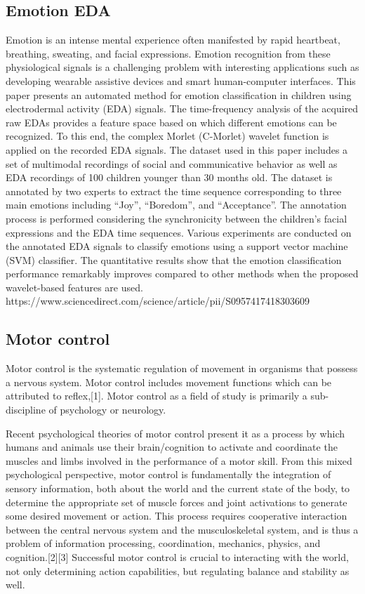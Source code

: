 \subsection{Emotion EDA}
Emotion is an intense mental experience often manifested by rapid heartbeat, breathing, sweating, and facial expressions. Emotion recognition from these physiological signals is a challenging problem with interesting applications such as developing wearable assistive devices and smart human-computer interfaces. This paper presents an automated method for emotion classification in children using electrodermal activity (EDA) signals. The time-frequency analysis of the acquired raw EDAs provides a feature space based on which different emotions can be recognized. To this end, the complex Morlet (C-Morlet) wavelet function is applied on the recorded EDA signals. The dataset used in this paper includes a set of multimodal recordings of social and communicative behavior as well as EDA recordings of 100 children younger than 30 months old. The dataset is annotated by two experts to extract the time sequence corresponding to three main emotions including “Joy”, “Boredom”, and “Acceptance”. The annotation process is performed considering the synchronicity between the children's facial expressions and the EDA time sequences. Various experiments are conducted on the annotated EDA signals to classify emotions using a support vector machine (SVM) classifier. The quantitative results show that the emotion classification performance remarkably improves compared to other methods when the proposed wavelet-based features are used.
https://www.sciencedirect.com/science/article/pii/S0957417418303609

\subsection{Motor control}
Motor control is the systematic regulation of movement in organisms that possess a nervous system. Motor control includes movement functions which can be attributed to reflex,[1]. Motor control as a field of study is primarily a sub-discipline of psychology or neurology.

Recent psychological theories of motor control present it as a process by which humans and animals use their brain/cognition to activate and coordinate the muscles and limbs involved in the performance of a motor skill. From this mixed psychological perspective, motor control is fundamentally the integration of sensory information, both about the world and the current state of the body, to determine the appropriate set of muscle forces and joint activations to generate some desired movement or action. This process requires cooperative interaction between the central nervous system and the musculoskeletal system, and is thus a problem of information processing, coordination, mechanics, physics, and cognition.[2][3] Successful motor control is crucial to interacting with the world, not only determining action capabilities, but regulating balance and stability as well.

